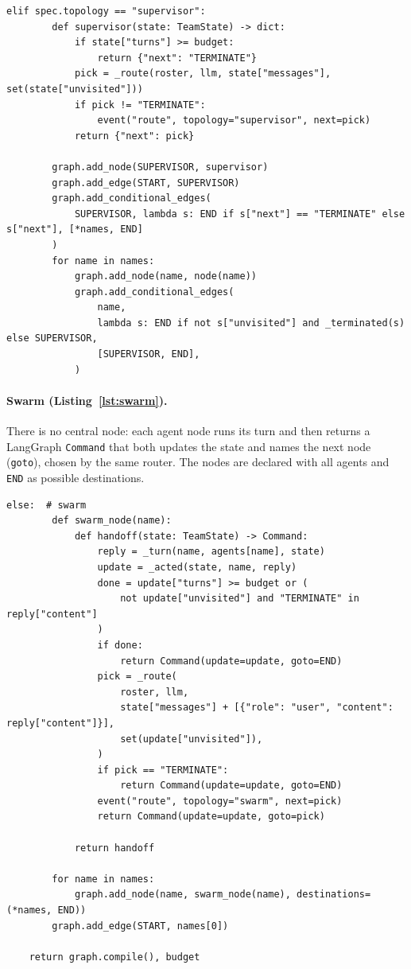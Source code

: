 \documentclass[11pt,a4paper]{article}
\DeclareRobustCommand{\code}[1]{{\renewcommand{\_}{\textunderscore\allowbreak}\texttt{#1}}}
\begin{document}
\begin{lstlisting}[firstnumber=173,style=py,caption={Supervisor wiring (\texttt{systems/graph.py}, lines 173--193)},label={lst:sup}]
    elif spec.topology == "supervisor":
        def supervisor(state: TeamState) -> dict:
            if state["turns"] >= budget:
                return {"next": "TERMINATE"}
            pick = _route(roster, llm, state["messages"], set(state["unvisited"]))
            if pick != "TERMINATE":
                event("route", topology="supervisor", next=pick)
            return {"next": pick}

        graph.add_node(SUPERVISOR, supervisor)
        graph.add_edge(START, SUPERVISOR)
        graph.add_conditional_edges(
            SUPERVISOR, lambda s: END if s["next"] == "TERMINATE" else s["next"], [*names, END]
        )
        for name in names:
            graph.add_node(name, node(name))
            graph.add_conditional_edges(
                name,
                lambda s: END if not s["unvisited"] and _terminated(s) else SUPERVISOR,
                [SUPERVISOR, END],
            )
\end{lstlisting}

\paragraph{Swarm (Listing~\ref{lst:swarm}).} There is no central node: each agent node
runs its turn and then returns a LangGraph \code{Command} that both updates the state and
names the next node (\code{goto}), chosen by the same router. The nodes are declared with
all agents and \code{END} as possible destinations.

\begin{lstlisting}[firstnumber=195,style=py,caption={Swarm wiring with hand-offs (\texttt{systems/graph.py}, lines 195--221)},label={lst:swarm}]
    else:  # swarm
        def swarm_node(name):
            def handoff(state: TeamState) -> Command:
                reply = _turn(name, agents[name], state)
                update = _acted(state, name, reply)
                done = update["turns"] >= budget or (
                    not update["unvisited"] and "TERMINATE" in reply["content"]
                )
                if done:
                    return Command(update=update, goto=END)
                pick = _route(
                    roster, llm,
                    state["messages"] + [{"role": "user", "content": reply["content"]}],
                    set(update["unvisited"]),
                )
                if pick == "TERMINATE":
                    return Command(update=update, goto=END)
                event("route", topology="swarm", next=pick)
                return Command(update=update, goto=pick)

            return handoff

        for name in names:
            graph.add_node(name, swarm_node(name), destinations=(*names, END))
        graph.add_edge(START, names[0])

    return graph.compile(), budget
\end{lstlisting}
\end{document}
